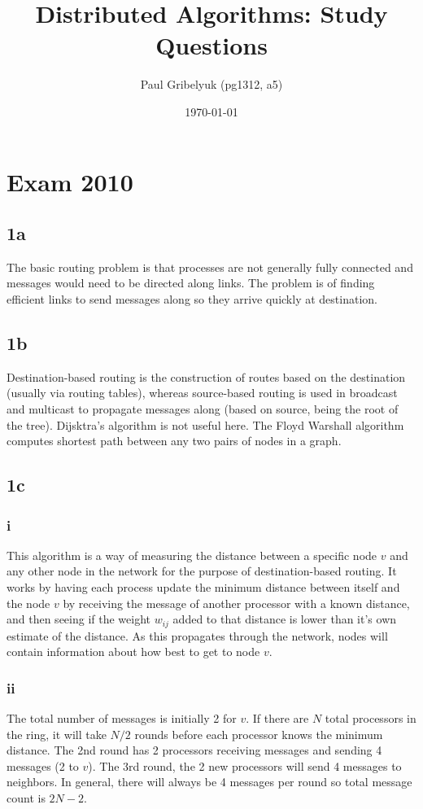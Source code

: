 \documentclass[a4paper,10pt,]{report}
\author{Paul Gribelyuk (pg1312, a5)}
\title{Distributed Algorithms: Study Questions}
\date{\today}
\begin{document}
\maketitle

\chapter{Exam 2010}
\section{1a}
The basic routing problem is that processes are not generally fully connected and messages would need to be directed along links.  The problem is of finding efficient links to send messages along so they arrive quickly at destination.
\section{1b}
Destination-based routing is the construction of routes based on the destination (usually via routing tables), whereas source-based routing is used in broadcast and multicast to propagate messages along (based on source, being the root of the tree).  Dijsktra's algorithm is not useful here.  The Floyd Warshall algorithm computes shortest path between any two pairs of nodes in a graph.
\section{1c}
\subsection{i}
This algorithm is a way of measuring the distance between a specific node $v$ and any other node in the network for the purpose of destination-based routing.  It works by having each process update the minimum distance between itself and the node $v$ by receiving the message of another processor with a known distance, and then seeing if the weight $w_{ij}$ added to that distance is lower than it's own estimate of the distance.  As this propagates through the network, nodes will contain information about how best to get to node $v$.
\subsection{ii}
The total number of messages is initially 2 for $v$.  If there are $N$ total processors in the ring, it will take $N/2$ rounds before each processor knows the minimum distance.  The 2nd round has 2 processors receiving messages and sending 4 messages (2 to $v$).  The 3rd round, the 2 new processors will send 4 messages to neighbors.  In general, there will always be 4 messages per round so total message count is $2N - 2$.
\end{document}
